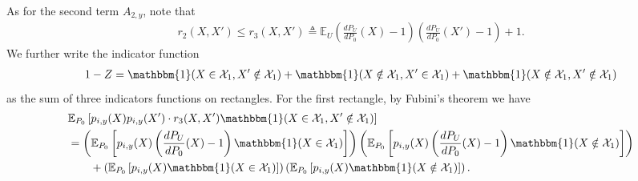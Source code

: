 \documentclass[final,12pt]{colt2018} %
\def \bE {\mathbb{E}}
\newcommand{\calX}{{\mathcal{X}}}
\begin{document}
As for the second term $A_{2,y}$, note that 
\begin{align*}
r_2(X,X') \le r_3(X,X') \triangleq \bE_U \left(\frac{dP_U}{dP_0}(X) - 1\right)\left(\frac{dP_U}{dP_0}(X') - 1\right) + 1. 
\end{align*}
We further write the indicator function 
\begin{align*}
1- Z = \mathbbm{1}(X\in\calX_1, X'\notin \calX_1) + \mathbbm{1}(X\notin\calX_1, X'\in \calX_1) + \mathbbm{1}(X\notin\calX_1, X'\notin \calX_1)
\end{align*}
as the sum of three indicators functions on rectangles. For the first rectangle, by Fubini's theorem we have
\begin{align}
& \bE_{P_0} \left[ p_{i,y}(X)p_{i,y}(X')\cdot r_3(X,X')\mathbbm{1}(X\in\calX_1, X'\notin \calX_1)\right] \nonumber \\
&= \left(\bE_{P_0} \left[p_{i,y}(X)\left(\frac{dP_U}{dP_0}(X) - 1\right)\mathbbm{1}(X\in\calX_1) \right] \right) \left(\bE_{P_0} \left[p_{i,y}(X)\left(\frac{dP_U}{dP_0}(X) - 1\right)\mathbbm{1}(X\notin\calX_1)\right] \right) \nonumber \\
&\qquad + \left(\bE_{P_0} \left[p_{i,y}(X)\mathbbm{1}(X\in \calX_1)\right] \right)\left(\bE_{P_0} \left[p_{i,y}(X)\mathbbm{1}(X\notin \calX_1)\right] \right). \label{eq.rectangle}
\end{align}
\end{document}
